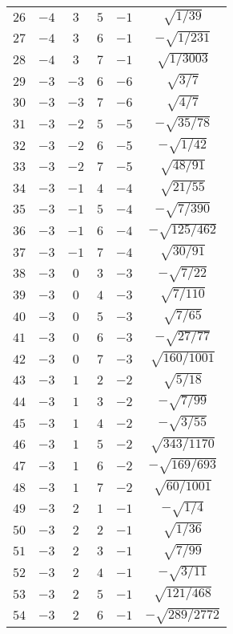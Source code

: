 \begin{table}
\begin{center}
\begin{tabular}{|c|c|c|c|c|c|}
$26$ & $-4$ & $3$ & $5$ & $-1$ & $\sqrt{1/39}$ \\ 
$27$ & $-4$ & $3$ & $6$ & $-1$ & $-\sqrt{1/231}$ \\ 
$28$ & $-4$ & $3$ & $7$ & $-1$ & $\sqrt{1/3003}$ \\ 
$29$ & $-3$ & $-3$ & $6$ & $-6$ & $\sqrt{3/7}$ \\ 
$30$ & $-3$ & $-3$ & $7$ & $-6$ & $\sqrt{4/7}$ \\ 
$31$ & $-3$ & $-2$ & $5$ & $-5$ & $-\sqrt{35/78}$ \\ 
$32$ & $-3$ & $-2$ & $6$ & $-5$ & $-\sqrt{1/42}$ \\ 
$33$ & $-3$ & $-2$ & $7$ & $-5$ & $\sqrt{48/91}$ \\ 
$34$ & $-3$ & $-1$ & $4$ & $-4$ & $\sqrt{21/55}$ \\ 
$35$ & $-3$ & $-1$ & $5$ & $-4$ & $-\sqrt{7/390}$ \\ 
$36$ & $-3$ & $-1$ & $6$ & $-4$ & $-\sqrt{125/462}$ \\ 
$37$ & $-3$ & $-1$ & $7$ & $-4$ & $\sqrt{30/91}$ \\ 
$38$ & $-3$ & $0$ & $3$ & $-3$ & $-\sqrt{7/22}$ \\ 
$39$ & $-3$ & $0$ & $4$ & $-3$ & $\sqrt{7/110}$ \\ 
$40$ & $-3$ & $0$ & $5$ & $-3$ & $\sqrt{7/65}$ \\ 
$41$ & $-3$ & $0$ & $6$ & $-3$ & $-\sqrt{27/77}$ \\ 
$42$ & $-3$ & $0$ & $7$ & $-3$ & $\sqrt{160/1001}$ \\ 
$43$ & $-3$ & $1$ & $2$ & $-2$ & $\sqrt{5/18}$ \\ 
$44$ & $-3$ & $1$ & $3$ & $-2$ & $-\sqrt{7/99}$ \\ 
$45$ & $-3$ & $1$ & $4$ & $-2$ & $-\sqrt{3/55}$ \\ 
$46$ & $-3$ & $1$ & $5$ & $-2$ & $\sqrt{343/1170}$ \\ 
$47$ & $-3$ & $1$ & $6$ & $-2$ & $-\sqrt{169/693}$ \\ 
$48$ & $-3$ & $1$ & $7$ & $-2$ & $\sqrt{60/1001}$ \\ 
$49$ & $-3$ & $2$ & $1$ & $-1$ & $-\sqrt{1/4}$ \\ 
$50$ & $-3$ & $2$ & $2$ & $-1$ & $\sqrt{1/36}$ \\ 
$51$ & $-3$ & $2$ & $3$ & $-1$ & $\sqrt{7/99}$ \\ 
$52$ & $-3$ & $2$ & $4$ & $-1$ & $-\sqrt{3/11}$ \\ 
$53$ & $-3$ & $2$ & $5$ & $-1$ & $\sqrt{121/468}$ \\ 
$54$ & $-3$ & $2$ & $6$ & $-1$ & $-\sqrt{289/2772}$ \\ 

\end{tabular}
\end{center}
\end{table}
